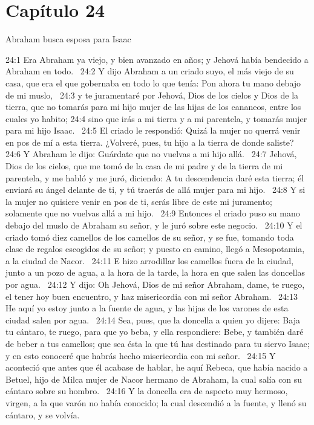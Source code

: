 \section*{Capítulo 24}
Abraham busca esposa para Isaac  

24:1 Era Abraham ya viejo, y bien avanzado en años; y Jehová había bendecido a Abraham en todo.  
24:2 Y dijo Abraham a un criado suyo, el más viejo de su casa, que era el que gobernaba en todo lo que tenía: Pon ahora tu mano debajo de mi muslo,  
24:3 y te juramentaré por Jehová, Dios de los cielos y Dios de la tierra, que no tomarás para mi hijo mujer de las hijas de los cananeos, entre los cuales yo habito; 
24:4 sino que irás a mi tierra y a mi parentela, y tomarás mujer para mi hijo Isaac.  
24:5 El criado le respondió: Quizá la mujer no querrá venir en pos de mí a esta tierra. ¿Volveré, pues, tu hijo a la tierra de donde saliste?  
24:6 Y Abraham le dijo: Guárdate que no vuelvas a mi hijo allá.  
24:7 Jehová, Dios de los cielos, que me tomó de la casa de mi padre y de la tierra de mi parentela, y me habló y me juró, diciendo: A tu descendencia daré esta tierra; él enviará su ángel delante de ti, y tú traerás de allá mujer para mi hijo.  
24:8 Y si la mujer no quisiere venir en pos de ti, serás libre de este mi juramento; solamente que no vuelvas allá a mi hijo.  
24:9 Entonces el criado puso su mano debajo del muslo de Abraham su señor, y le juró sobre este negocio.  
24:10 Y el criado tomó diez camellos de los camellos de su señor, y se fue, tomando toda clase de regalos escogidos de su señor; y puesto en camino, llegó a Mesopotamia, a la ciudad de Nacor.  
24:11 E hizo arrodillar los camellos fuera de la ciudad, junto a un pozo de agua, a la hora de la tarde, la hora en que salen las doncellas por agua.  
24:12 Y dijo: Oh Jehová, Dios de mi señor Abraham, dame, te ruego, el tener hoy buen encuentro, y haz misericordia con mi señor Abraham.  
24:13 He aquí yo estoy junto a la fuente de agua, y las hijas de los varones de esta ciudad salen por agua.  
24:14 Sea, pues, que la doncella a quien yo dijere: Baja tu cántaro, te ruego, para que yo beba, y ella respondiere: Bebe, y también daré de beber a tus camellos; que sea ésta la que tú has destinado para tu siervo Isaac; y en esto conoceré que habrás hecho misericordia con mi señor.  
24:15 Y aconteció que antes que él acabase de hablar, he aquí Rebeca, que había nacido a Betuel, hijo de Milca mujer de Nacor hermano de Abraham, la cual salía con su cántaro sobre su hombro.  
24:16 Y la doncella era de aspecto muy hermoso, virgen, a la que varón no había conocido; la cual descendió a la fuente, y llenó su cántaro, y se volvía.  
